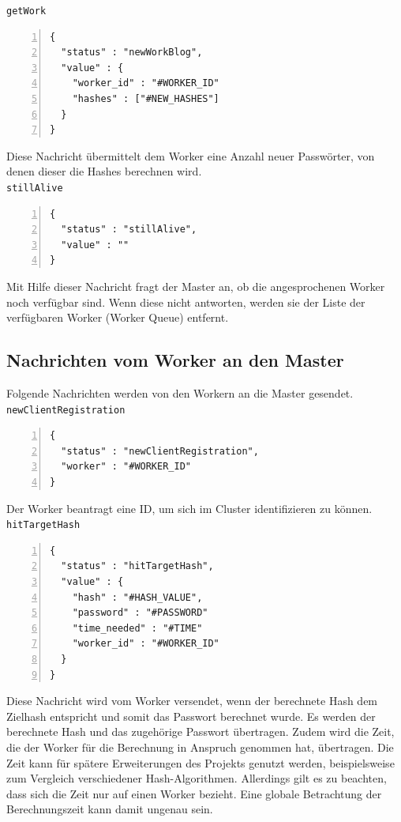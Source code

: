 \texttt{getWork}
\begin{lstlisting}[basicstyle=\ttfamily,numbers=left,numberstyle=\footnotesize\ttfamily,backgroundcolor=\color{sourcegray}]
{
  "status" : "newWorkBlog",
  "value" : {
    "worker_id" : "#WORKER_ID"
    "hashes" : ["#NEW_HASHES"]
  }
}\end{lstlisting}
Diese Nachricht übermittelt dem Worker eine Anzahl neuer Passwörter, von denen dieser die Hashes berechnen wird.\\


\texttt{stillAlive}
\begin{lstlisting}[basicstyle=\ttfamily,numbers=left,numberstyle=\footnotesize\ttfamily,backgroundcolor=\color{sourcegray}]
{
  "status" : "stillAlive",
  "value" : ""
}
\end{lstlisting}
Mit Hilfe dieser Nachricht fragt der Master an, ob die angesprochenen Worker noch verfügbar sind. Wenn diese nicht antworten, werden sie der Liste der verfügbaren Worker (Worker Queue) entfernt. 


\subsection{Nachrichten vom Worker an den Master}
Folgende Nachrichten werden von den Workern an die Master gesendet. \\

\texttt{newClientRegistration}
\begin{lstlisting}[basicstyle=\ttfamily,numbers=left,numberstyle=\footnotesize\ttfamily,backgroundcolor=\color{sourcegray}]
{
  "status" : "newClientRegistration",
  "worker" : "#WORKER_ID"
}
\end{lstlisting}
Der Worker beantragt eine ID, um sich im Cluster identifizieren zu können.\\

\texttt{hitTargetHash}
\begin{lstlisting}[basicstyle=\ttfamily,numbers=left,numberstyle=\footnotesize\ttfamily,backgroundcolor=\color{sourcegray}]
{
  "status" : "hitTargetHash",
  "value" : {
    "hash" : "#HASH_VALUE",
    "password" : "#PASSWORD"
    "time_needed" : "#TIME"
    "worker_id" : "#WORKER_ID"
  }
}\end{lstlisting}
Diese Nachricht wird vom Worker versendet, wenn der berechnete Hash dem Zielhash entspricht und somit das Passwort berechnet wurde. Es werden der berechnete Hash und das zugehörige Passwort übertragen. Zudem wird die Zeit, die der Worker für die Berechnung in Anspruch genommen hat, übertragen. Die Zeit kann für spätere Erweiterungen des Projekts genutzt werden, beispielsweise zum Vergleich verschiedener Hash-Algorithmen. Allerdings gilt es zu beachten, dass sich die Zeit nur auf einen Worker bezieht. Eine globale Betrachtung der Berechnungszeit kann damit ungenau sein. \\


